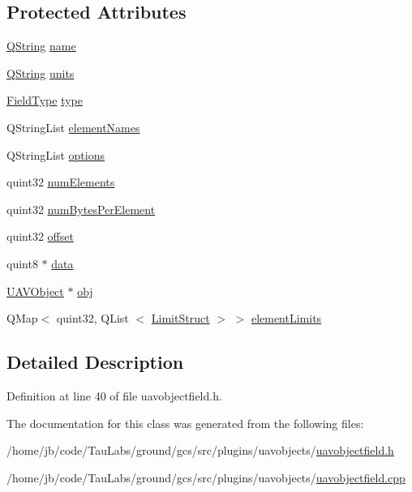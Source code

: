 \subsection*{\-Protected \-Attributes}
\begin{DoxyCompactItemize}
\item 
\hyperlink{group___u_a_v_objects_plugin_gab9d252f49c333c94a72f97ce3105a32d}{\-Q\-String} \hyperlink{group___u_a_v_objects_plugin_ga9909de3b60e1a954d7356cfc61357b30}{name}
\item 
\hyperlink{group___u_a_v_objects_plugin_gab9d252f49c333c94a72f97ce3105a32d}{\-Q\-String} \hyperlink{group___u_a_v_objects_plugin_ga1ecf5fdaab2ac408b67623d5d75368c5}{units}
\item 
\hyperlink{group___u_a_v_objects_plugin_ga74498368bc91f3ed74beacb096744cf3}{\-Field\-Type} \hyperlink{group___u_a_v_objects_plugin_gad84e6c3a333d2c62b5159936e42fb737}{type}
\item 
\-Q\-String\-List \hyperlink{group___u_a_v_objects_plugin_ga5849334da3325c4cac8625bb5910d57d}{element\-Names}
\item 
\-Q\-String\-List \hyperlink{group___u_a_v_objects_plugin_ga97fe1c3ed2d74eb06ea7e24abf4ce09c}{options}
\item 
quint32 \hyperlink{group___u_a_v_objects_plugin_gaa82f6e1f5deca501c58b45d902be0ef4}{num\-Elements}
\item 
quint32 \hyperlink{group___u_a_v_objects_plugin_gaed675e1711f18b1ab737f9e8e55dca35}{num\-Bytes\-Per\-Element}
\item 
quint32 \hyperlink{group___u_a_v_objects_plugin_ga8d473734be71fe3a3dbcd1a854b497f2}{offset}
\item 
quint8 $\ast$ \hyperlink{group___u_a_v_objects_plugin_gae6a068d71cfd70f70c7e6fb10f217ca5}{data}
\item 
\hyperlink{class_u_a_v_object}{\-U\-A\-V\-Object} $\ast$ \hyperlink{group___u_a_v_objects_plugin_ga750b9ade4270026bd2d02d37468597b5}{obj}
\item 
\-Q\-Map$<$ quint32, \-Q\-List\*
$<$ \hyperlink{struct_u_a_v_object_field_1_1_limit_struct}{\-Limit\-Struct} $>$ $>$ \hyperlink{group___u_a_v_objects_plugin_ga16abb7c1b891411815fe34473448b9ce}{element\-Limits}
\end{DoxyCompactItemize}


\subsection{\-Detailed \-Description}


\-Definition at line 40 of file uavobjectfield.\-h.



\-The documentation for this class was generated from the following files\-:\begin{DoxyCompactItemize}
\item 
/home/jb/code/\-Tau\-Labs/ground/gcs/src/plugins/uavobjects/\hyperlink{uavobjectfield_8h}{uavobjectfield.\-h}\item 
/home/jb/code/\-Tau\-Labs/ground/gcs/src/plugins/uavobjects/\hyperlink{uavobjectfield_8cpp}{uavobjectfield.\-cpp}\end{DoxyCompactItemize}
